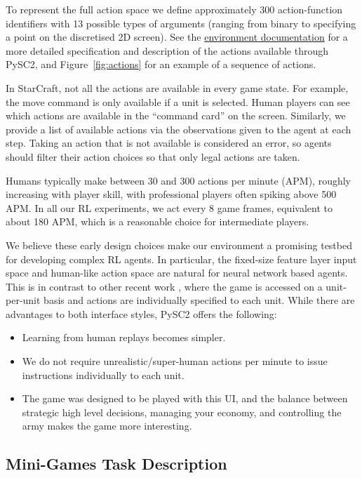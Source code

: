 To represent the full action space we define approximately 300 action-function identifiers with 13 possible types of arguments (ranging from binary to specifying a point on the discretised 2D screen). See the \href{https://github.com/deepmind/pysc2/blob/master/docs/environment.md}{environment documentation} for a more detailed specification and description of the actions available through PySC2, and Figure~\ref{fig:actions} for an example of a sequence of actions.

In StarCraft, not all the actions are available in every game state. For example, the move command is only available if a unit is selected. Human players can see which actions are available in the ``command card'' on the screen. Similarly, we provide a list of available actions via the observations given to the agent at each step. Taking an action that is not available is considered an error, so agents should filter their action choices so that only legal actions are taken.

Humans typically make between 30 and 300 actions per minute (APM), roughly increasing with player skill, with professional players often spiking above 500 APM. In all our RL experiments, we act every 8 game frames, equivalent to about 180 APM, which is a reasonable choice for intermediate players.

We believe these early design choices make our environment a promising testbed for developing complex RL agents.  In particular, the fixed-size feature layer input space and human-like action space are natural for neural network based agents.  This is in contrast to other recent work \cite{synnaeve2016torchcraft, peng2017multiagent}, where the game is accessed on a unit-per-unit basis and actions are individually specified to each unit.  While there are advantages to both interface styles, PySC2 offers the following:

\begin{itemize}
    \item Learning from human replays becomes simpler.
    \item We do not require unrealistic/super-human actions per minute to issue instructions individually to each unit.
    \item The game was designed to be played with this UI, and the balance between strategic high level decisions, managing your economy, and controlling the army makes the game more interesting.
\end{itemize}

\subsection{Mini-Games Task Description}

